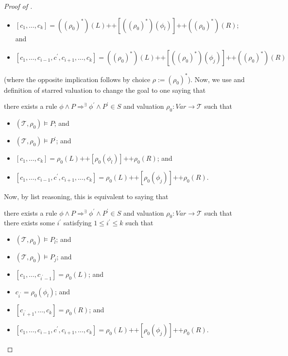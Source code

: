 \begin{proof}[Proof of ]
\begin{proofenv}
\begin{itemize}
    \item $[c_1,\ldots,c_k] = ((\rho_0)^*)(L) \texttt{++} [((\rho_0)^*)(\phi_l)] \texttt{++} ((\rho_0)^*)(R)$; and
    \item $[c_1, \ldots, c_{i-1}, c^\prime, c_{i+1}, \ldots, c_k] = ((\rho_0)^*)(L)
    \texttt{++} [((\rho_0)^*)(\phi_j)] 
    \texttt{++} ((\rho_0)^*)(R)$
\end{itemize}
\end{proofenv}
(where the opposite implication follows by choice $\rho := (\rho_0)^*$).
Now, we use  and definition of starred valuation to change the goal to one saying that
\begin{proofenv}
there exists a rule $\phi \land P \Rightarrow^\exists \phi^\prime \land P^\prime \in S$
and valuation $\rho_0 : \mathit{Var} \to \mathcal{T}$ such that
\begin{itemize}
    \item $(\mathcal{T}, \rho_0) \vDash P$; and
    \item $(\mathcal{T}, \rho_0) \vDash P^\prime$; and
    \item $[c_1,\ldots,c_k] = \rho_0(L) \texttt{++} [\rho_0(\phi_l)] \texttt{++} \rho_0(R)$; and
    \item $[c_1, \ldots, c_{i-1}, c^\prime, c_{i+1}, \ldots, c_k] = \rho_0(L)
    \texttt{++} [\rho_0(\phi_j)] 
    \texttt{++} \rho_0(R)$.
\end{itemize}
\end{proofenv}
Now, by list reasoning, this is equivalent to
saying that
\begin{proofenv}
there exists a rule $\phi \land P \Rightarrow^\exists \phi^\prime \land P^\prime \in S$
and valuation $\rho_0 : \mathit{Var} \to \mathcal{T}$ such that
there exists some $i^\prime$ satisfying $1 \leq i^\prime \leq k$
such that
\begin{itemize}
    \item $(\mathcal{T}, \rho_0) \vDash P_l$; and
    \item $(\mathcal{T}, \rho_0) \vDash P_j$; and
    \item $[c_1,\ldots, c_{i^\prime-1}] = \rho_0(L)$; and
    \item $c_{i^\prime} = \rho_0(\phi_l)$; and
    \item $[c_{i^\prime+1},\ldots,c_k] = \rho_0(R)$; and
    \item $[c_1, \ldots, c_{i-1}, c^\prime, c_{i+1}, \ldots, c_k] = \rho_0(L)
    \texttt{++} [\rho_0(\phi_j)] 
    \texttt{++} \rho_0(R)$.
\end{itemize}

\end{proofenv}
\end{proof}

